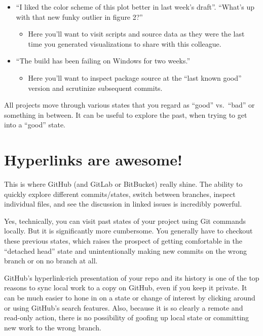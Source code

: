 \documentclass[
]{book}
\providecommand{\tightlist}{%
  \setlength{\itemsep}{0pt}\setlength{\parskip}{0pt}}
\begin{document}
\begin{itemize}
\tightlist
\item
  ``I liked the color scheme of this plot better in last week's draft''. ``What's up with that new funky outlier in figure 2?''

  \begin{itemize}
  \tightlist
  \item
    Here you'll want to visit scripts and source data as they were the last time you generated visualizations to share with this colleague.
  \end{itemize}
\item
  ``The build has been failing on Windows for two weeks.''

  \begin{itemize}
  \tightlist
  \item
    Here you'll want to inspect package source at the ``last known good'' version and scrutinize subsequent commits.
  \end{itemize}
\end{itemize}

All projects move through various states that you regard as ``good'' vs.~``bad'' or something in between. It can be useful to explore the past, when trying to get into a ``good'' state.

\section{Hyperlinks are awesome!}\label{hyperlinks-are-awesome}

This is where GitHub (and GitLab or BitBucket) really shine. The ability to quickly explore different commits/states, switch between branches, inspect individual files, and see the discussion in linked issues is incredibly powerful.

Yes, technically, you can visit past states of your project using Git commands locally. But it is significantly more cumbersome. You generally have to checkout these previous states, which raises the prospect of getting comfortable in the ``detached head'' state and unintentionally making new commits on the wrong branch or on no branch at all.

GitHub's hyperlink-rich presentation of your repo and its history is one of the top reasons to sync local work to a copy on GitHub, even if you keep it private. It can be much easier to hone in on a state or change of interest by clicking around or using GitHub's search features. Also, because it is so clearly a remote and read-only action, there is no possibility of goofing up local state or committing new work to the wrong branch.
\end{document}
